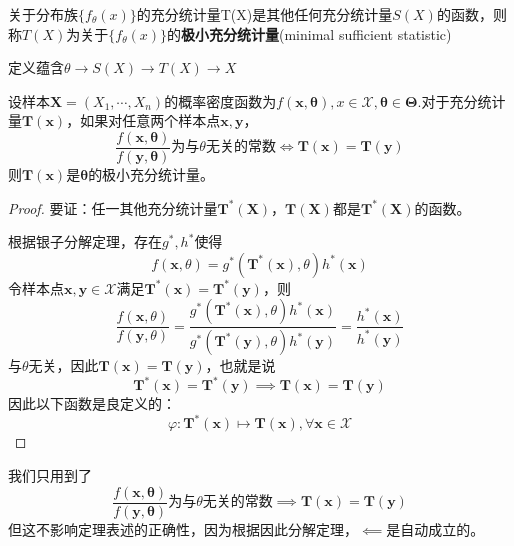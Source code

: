 \documentclass{ctexbook}
\begin{document}
\begin{definition}[极小充分统计量]
    关于分布族$\{f_{\theta}(x)\}$的充分统计量T(X)是其他任何充分统计量$S(X)$的函数，则称$T(X)$为关于$\{f_{\theta}(x)\}$的\textbf{极小充分统计量}(minimal sufficient statistic)
    
    定义蕴含$\theta \to S(X) \to T(X) \to X$
\end{definition}

\begin{theorem}
    设样本$\mathbf{X}=(X_1,\cdots,X_n)$的概率密度函数为$f(\mathbf{x},\boldsymbol{\theta}),x\in\mathcal{X} ,\boldsymbol{\theta}\in\boldsymbol{\Theta}$.对于充分统计量$\mathbf{T}(\mathbf{x})$，如果对任意两个样本点$\mathbf{x},\mathbf{y}$，
    $$\frac{f(\mathbf{x},\boldsymbol{\theta})}{f(\mathbf{y},\boldsymbol{\theta})}\text{为与}\theta\text{无关的常数}\iff \mathbf{T}(\mathbf{x})=\mathbf{T}(\mathbf{y})$$
    则$\mathbf{T}(\mathbf{x})$是$\boldsymbol{\theta}$的极小充分统计量。
\end{theorem}
\begin{proof}
    要证：任一其他充分统计量$\mathbf{T}^*(\mathbf{X})$，$\mathbf{T}(\mathbf{X})$都是$\mathbf{T}^*(\mathbf{X})$的函数。

    根据银子分解定理，存在$g^*,h^*$使得
    $$f(\mathbf{x},\theta)=g^*(\mathbf{T^*(x)},\theta)h^*(\mathbf{x})$$
    令样本点$\mathbf{x},\mathbf{y}\in\mathcal{X}$满足$\mathbf{T}^*(\mathbf{x})=\mathbf{T}^*(\mathbf{y})$，则
    $$\frac{f(\mathbf{x},\theta)}{f(\mathbf{y},\theta)}=\frac{g^*(\mathbf{T}^*(\mathbf{x}),\theta)h^*(\mathbf{x})}{g^*(\mathbf{T}^*(\mathbf{y}),\theta)h^*(\mathbf{y})}=\frac{h^*(\mathbf{x})}{h^*(\mathbf{y})}$$
    与$\theta$无关，因此$\mathbf{T}(\mathbf{x})=\mathbf{T}(\mathbf{y})$，也就是说
    $$\mathbf{T}^*(\mathbf{x})=\mathbf{T}^*(\mathbf{y})\implies \mathbf{T}(\mathbf{x})=\mathbf{T}(\mathbf{y})$$
    因此以下函数是良定义的：
    $$\varphi:\mathbf{T}^*(\mathbf{x})\mapsto\mathbf{T}(\mathbf{x}),\forall \mathbf{x}\in\mathcal{X}$$
\end{proof}
\begin{remark}
    我们只用到了
    $$\frac{f(\mathbf{x},\boldsymbol{\theta})}{f(\mathbf{y},\boldsymbol{\theta})}\text{为与}\theta\text{无关的常数}\implies \mathbf{T}(\mathbf{x})=\mathbf{T}(\mathbf{y})$$
    但这不影响定理表述的正确性，因为根据因此分解定理，$\impliedby$是自动成立的。
\end{remark}
\end{document}
